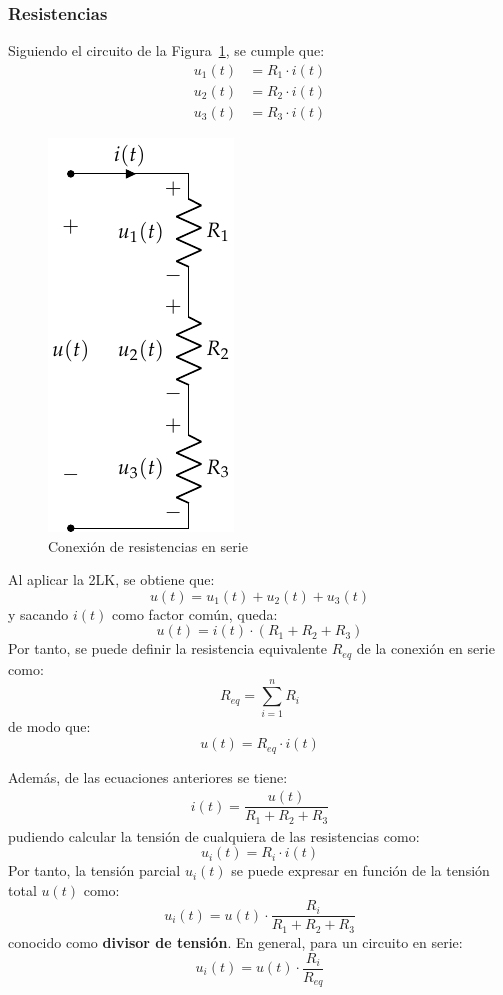 	\subsubsection{Resistencias}
	Siguiendo el circuito de la Figura~\ref{fig.serie}, se cumple que:
		\begin{align*}
			u_1(t) &= R_1 \cdot i(t)\\
			u_2(t) &= R_2 \cdot i(t)\\
			u_3(t) &= R_3 \cdot i(t)
		\end{align*}
		\begin{figure}[H]
			\centering
			\includegraphics[width=0.2\linewidth]{../figs/AsociacionSerie.pdf}
			\caption{Conexión de resistencias en serie}
			\label{fig.serie}
		\end{figure}
		Al aplicar la 2LK, se obtiene que: 
		\begin{equation*}
			u(t) = u_1(t) + u_2(t) + u_3(t)
		\end{equation*}
		y sacando $i(t)$ como factor común, queda:
		\begin{equation*}
			u(t) = i(t) \cdot (R_1 + R_2 + R_3)
		\end{equation*}
		Por tanto, se puede definir la resistencia equivalente $R_{eq}$ de la conexión en serie como:
		\begin{equation}
			\boxed{R_{eq} = \sum_{i = 1}^n R_i}
		\end{equation}
		de modo que:
		\begin{equation*}
			u(t) = R_{eq} \cdot i(t)
		\end{equation*}
		
		Además, de las ecuaciones anteriores se tiene:
		\begin{align*}
			i(t) = \dfrac{u(t)}{R_1 + R_2 + R_3}
		\end{align*}
		pudiendo calcular la tensión de cualquiera de las resistencias como: 
		\begin{equation*}
			u_i(t) = R_i \cdot i(t)
		\end{equation*}
		Por tanto, la tensión parcial $u_i(t)$ se puede expresar en función de la tensión total $u(t)$ como: 
		\begin{equation*}
			u_i(t) = u(t) \cdot \frac{R_i}{R_1 + R_2 + R_3}
		\end{equation*}
		conocido como \textbf{divisor de tensión}. En general, para un circuito en serie:
		\begin{equation}
			\boxed{u_i(t) = u(t) \cdot \frac{R_i}{R_{eq}}}
		\end{equation}
